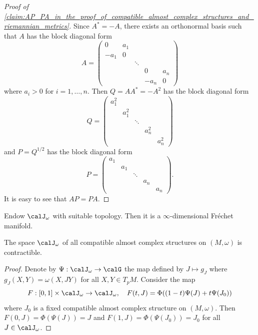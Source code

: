   \begin{proof}[Proof of \cref{claim:AP_PA_in_the_proof_of_compatible_almost_complex_structures_and_riemannian_metrics}]
    Since $A^* = -A$, there exists an orthonormal basis such that $A$ has the block diagonal form
    \[ A = \begin{pmatrix}
        0 & a_1 & & & \\
        -a_1 & 0 & & & \\
        & & \ddots & & \\
        & & & 0 & a_n \\
        & & & -a_n & 0
      \end{pmatrix} \]
    where $a_i > 0$ for $i = 1, \dots, n$.
    Then $Q = A A^* = -A^2$ has the block diagonal form
    \[ Q = \begin{pmatrix}
        a_1^2 & & & & \\
        & a_1^2 & & & \\
        & & \ddots & & \\
        & & & a_n^2 & \\
        & & & & a_n^2
      \end{pmatrix} \]
    and $P = Q^{1/2}$ has the block diagonal form
    \[ P = \begin{pmatrix}
        a_1 & & & & \\
        & a_1 & & & \\
        & & \ddots & & \\
        & & & a_n & \\
        & & & & a_n
      \end{pmatrix}. \]
    It is easy to see that $AP = PA$.
  \end{proof}

  \begin{remark}
    Endow $\calJ_\omega$ with suitable topology.
    Then it is a $\infty$-dimensional Fréchet manifold. 
  \end{remark}

  \begin{theorem}
    The space $\calJ_\omega$ of all compatible almost complex structures on $(M, \omega)$ is contractible.
  \end{theorem}
  \begin{proof}
    Denote by $\Psi: \calJ_\omega \to \calG$ the map defined by $J \mapsto g_J$ where $g_J(X, Y) = \omega(X, JY)$ for all $X, Y \in T_p M$.
    Consider the map
    \[ F: [0,1] \times \calJ_\omega \to \calJ_\omega, \quad F(t, J) = \Phi((1-t) \Psi(J) + t \Psi(J_0)) \]
    where $J_0$ is a fixed compatible almost complex structure on $(M, \omega)$.
    Then $F(0, J) = \Phi(\Psi(J)) = J$ and $F(1, J) = \Phi(\Psi(J_0)) = J_0$ for all $J \in \calJ_\omega$.
  \end{proof}

